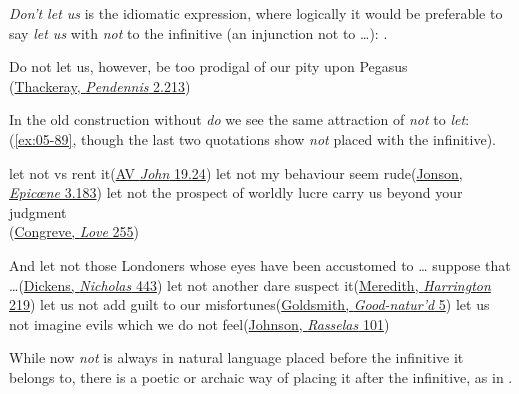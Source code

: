 \textit{Don't let us} is the idiomatic expression, where logically it would be preferable to say \textit{let us} with \textit{not} to the infinitive (an injunction not to {\dots}): .

\ea \label{ex:05-88}
Do not let us, however, be too prodigal of our pity upon Pegasus\\\hfill(\href{https://archive.org/details/dli.ministry.14127/page/343/mode/2up?q=%22be+too+prodigal%22&view=theater}{Thackeray, \textit{Pendennis} 2.213}) %
\z

In the old construction without \textit{do} we see the same attraction of \textit{not} to \textit{let}: (\ref{ex:05-89}, though the last two quotations show \textit{not} placed with the infinitive).

\ea \label{ex:05-89}
\ea
let not vs rent it\hfill(\href{https://www.kingjamesbibleonline.org/1611_John-19-24/}{AV \textit{John} 19.24})
\ex
let not my behaviour seem rude\hfill(\href{https://archive.org/details/bim_eighteenth-century_epicne-or-the-silent-_jonson-ben_1776/page/n29/mode/2up?q=%22behaviour%22&view=theater}{Jonson, \textit{Epicœne} 3.183})
\ex
let not the prospect of worldly lucre carry us beyond your judgment\\\hfill(\href{https://archive.org/details/in.ernet.dli.2015.219151/page/n195/mode/2up?q=%22worldly+lucre%22&view=theater}{Congreve, \textit{Love} 255}) %
\ex

And let not those Londoners whose eyes have been accustomed to {\dots} suppose that {\dots}\hfill(\href{https://archive.org/details/lifeadventuresofdickrich/page/466/mode/2up?q=%22those+Londoners+whose%22&view=theater}{Dickens, \textit{Nicholas} 443}) %
\ex
let not another dare suspect it\hfill(\href{https://archive.org/details/evanharringtonno00mererich/page/194/mode/2up?q=%22dare+suspect%22&view=theater}{Meredith, \textit{Harrington} 219})
\ex
let us not add guilt to our misfortunes\hfill(\href{https://quod.lib.umich.edu/cgi/t/text/pageviewer-idx?c=ecco;cc=ecco;idno=004771299.0001.000;node=004771299.0001.000:6.1;seq=189;page=root;view=text}{Goldsmith, \textit{Good-natur'd} 5})
\ex
let us not imagine evils which we do not feel\hfill(\href{https://archive.org/details/historyrasselas01johngoog/page/n105/mode/2up?q=%22let+us+not+imagine%22&view=theater}{Johnson, \textit{Rasselas} 101}) %
\z
\z

While now \textit{not} is always in natural language placed before the infinitive it belongs to, there is a poetic or archaic way of placing it after the infinitive, as in .
\pagebreak

